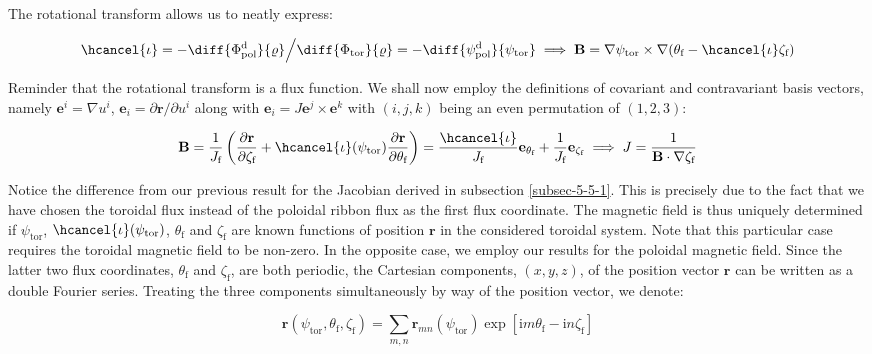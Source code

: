 The rotational transform allows us to neatly express:

\begin{equation}
    \hcancel{\iota}=-\diff{\Phi_\text{pol}^\mathrm{d}}{\varrho}\Big/\diff{\Phi_\text{tor}}{\varrho}=-\diff{\psi_\text{pol}^\mathrm{d}}{\psi_\text{tor}}\implies\mathbf{B}=\nabla\psi_\text{tor}\times\nabla(\theta_\text{f}-\hcancel{\iota}\zeta_\text{f})
\end{equation}

Reminder that the rotational transform is a flux function. We shall now employ the definitions of covariant and contravariant basis vectors, namely $\mathbf{e}^i=\nabla u^i$, $\mathbf{e}_i=\partial\mathbf{r}/\partial u^i$ along with $\mathbf{e}_i=J\mathbf{e}^j\times\mathbf{e}^k$ with $(i,j,k)$ being an even permutation of $(1,2,3)$:

\begin{equation}
    \mathbf{B}=\frac{1}{J_\text{f}}\left(\frac{\partial\mathbf{r}}{\partial\zeta_\text{f}}+\hcancel{\iota}(\psi_\text{tor})\frac{\partial\mathbf{r}}{\partial\theta_\text{f}}\right)=\frac{\hcancel{\iota}}{J_\text{f}}\mathbf{e}_{\theta_\text{f}}+\frac{1}{J_\text{f}}\mathbf{e}_{\zeta_\text{f}}\implies J=\frac{1}{\mathbf{B}\cdot\nabla\zeta_\text{f}}
\end{equation}

Notice the difference from our previous result for the Jacobian derived in subsection \ref{subsec-5-5-1}. This is precisely due to the fact that we have chosen the toroidal flux instead of the poloidal ribbon flux as the first flux coordinate. The magnetic field is thus uniquely determined if $\psi_\text{tor}$, $\hcancel{\iota}(\psi_\text{tor})$, $\theta_\text{f}$ and $\zeta_\text{f}$ are known functions of position $\mathbf{r}$ in the considered toroidal system. Note that this particular case requires the toroidal magnetic field to be non-zero. In the opposite case, we employ our results for the poloidal magnetic field. Since the latter two flux coordinates, $\theta_\text{f}$ and $\zeta_\text{f}$, are both periodic, the Cartesian components, $(x,y,z)$, of the position vector $\mathbf{r}$ can be written as a double Fourier series. Treating the three components simultaneously by way of the position vector, we denote:

\begin{equation}
    \mathbf{r}(\psi_\text{tor},\theta_\text{f},\zeta_\text{f})=\sum_{m,n}\mathbf{r}_{mn}(\psi_\text{tor})\exp{\left[\mathrm{i}m\theta_\text{f}-\mathrm{i}n\zeta_\text{f}\right]}
\end{equation}

